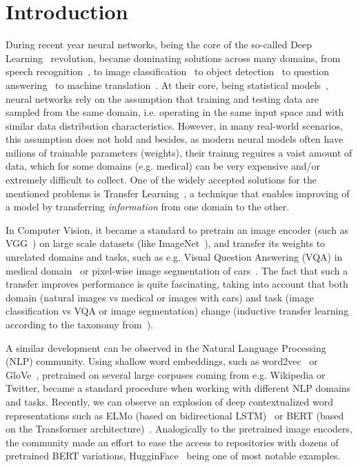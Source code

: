 \section{Introduction}
During recent year neural networks, being the core of the so-called Deep Learning~\cite{lecun2015deep} revolution, became dominating solutions across many domains, from  speech recognition~\cite{graves2013speech}, to image classification~\cite{krizhevsky2012imagenet} to object detection~\cite{redmon2016you} to question answering~\cite{weston2014memory} to machine translation~\cite{bahdanau2014neural}.
At their core, being statistical models~\cite{ripley1993statistical,warner1996understanding}, neural networks rely on the assumption that training and testing data are sampled from the same domain, i.e. operating in the same input space and with similar data distribution characteristics.
However, in many real-world scenarios, this assumption does not hold and besides, as modern neural models often have  milions of trainable parameters (weights), their trainng reguires a vaist amount of data, which for some domains (e.g. medical) can be very expensive and/or extremely difficult to collect.
One of the widely accepted solutions for the mentioned problems is Transfer Learning~\cite{pan2009survey,weiss2016survey}, a technique that enables improving of a model by transferring \emph{information} from one domain to the other. 


In Computer Vision, it became a standard to pretrain an image encoder (such as VGG~\cite{simonyan2014very}) on large scale datasets (like ImageNet~\cite{deng2009imagenet}), and transfer its weights to unrelated domains and tasks, such as e.g. Visual Question Answering (VQA) in medical domain~\cite{kornuta2019leveraging} or pixel-wise image segmentation of cars~\cite{iglovikov2018ternausnet}.
The fact that such a transfer improves performance is quite fascinating, taking into account that both domain (natural images vs medical or images with cars) and task (image classification vs VQA or image segmentation) change (inductive transfer learning according to the taxonomy from~\cite{pan2009survey}).

A similar development can be observed in the Natural Language Processing (NLP) community.
Using shallow word embeddings, such as word2vec~\cite{mikolov2013distributed} or GloVe~\cite{pennington2014glove}, pretrained on several large corpuses coming from e.g. Wikipedia or Twitter, became a standard procedure when working with different NLP domains and tasks.
Recently, we can observe an explosion of deep contextualized word representations such as ELMo (based on bidirectional LSTM)~\cite{peters2018deep} or BERT (based on the Transformer architecture)~\cite{devlin2018bert}.
Analogically to the pretrained image encoders, the community made an effort to ease the access to repositories with dozens of pretrained BERT variations, HugginFace~\cite{wolf2019transformers} being one of most notable examples.


